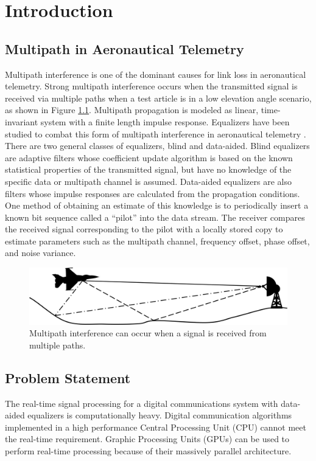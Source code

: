 \chapter{Introduction}
\section{Multipath in Aeronautical Telemetry}
Multipath interference is one of the dominant causes for link loss in aeronautical telemetry.
Strong multipath interference occurs when the transmitted signal is received via multiple paths when a test article is in a low elevation angle scenario, as shown in Figure \ref{fig:multipath}.
Multipath propagation is modeled as linear, time-invariant system with a finite length impulse response.
Equalizers have been studied to combat this form of multipath interference in aeronautical telemetry \cite{rice-afran-saquib:2014,rice-afran-saquib-cole-rhodes-moazzami:2014}.
There are two general classes of equalizers, blind and data-aided.
Blind equalizers are adaptive filters whose coefficient update algorithm is based on the known statistical properties of the transmitted signal, but have no knowledge of the specific data or multipath channel is assumed.
Data-aided equalizers are also filters whose impulse responses are calculated from the propagation conditions.
One method of obtaining an estimate of this knowledge is to periodically insert a known bit sequence called a ``pilot'' into the data stream.
The receiver compares the received signal corresponding to the pilot with a locally stored copy to estimate parameters such as the multipath channel, frequency offset, phase offset, and noise variance.
\begin{figure}
	\centering\includegraphics[width=12.11in/100*50]{figures/intro/Picture1.jpg}
	\caption{Multipath interference can occur when a signal is received from multiple paths.}
	\label{fig:multipath}
\end{figure}
\section{Problem Statement}
The real-time signal processing for a digital communications system with data-aided equalizers is computationally heavy.
Digital communication algorithms implemented in a high performance Central Processing Unit (CPU) cannot meet the real-time requirement.
Graphic Processing Units (GPUs) can be used to perform real-time processing because of their massively parallel architecture.

